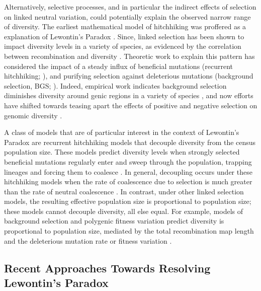 \documentclass[9pt,lineno]{elife}
\begin{document}
Alternatively, selective processes, and in particular the indirect effects of
selection on linked neutral variation, could potentially explain the observed
narrow range of diversity. The earliest mathematical model of hitchhiking was
proffered as a explanation of Lewontin's Paradox \citep{Maynard_Smith1974-zr}.
Since, linked selection has been shown to impact diversity levels in a variety
of species, as evidenced by the correlation between recombination and diversity
\citep{Aguade1989-jx,Begun1992-ey,Cutter2003-tl,Stephan1998-hh,Cai2009-by}.
Theoretic work to explain this pattern has considered the impact of a steady
influx of beneficial mutations (recurrent hitchhiking;
\cite{Stephan1992-jc,Stephan1995-ry}), and purifying selection against
deleterious mutations (background selection, BGS;
\cite{Charlesworth1993-gb,Nordborg1996-nq,Hudson1994-oh,Hudson1995-xc}).
Indeed, empirical work indicates background selection diminishes diversity
around genic regions in a variety of species
\citep{McVicker2009-ax,Hernandez2011-gs,Charlesworth1996-px}, and now efforts
have shifted towards teasing apart the effects of positive and negative
selection on genomic diversity \citep{Elyashiv2016-vt}.

A class of models that are of particular interest in the context of Lewontin's
Paradox are recurrent hitchhiking models that decouple diversity from the
census population size. These models predict diversity levels when strongly
selected beneficial mutations regularly enter and sweep through the population,
trapping lineages and forcing them to coalesce
\citep{Kaplan1989-sc,Gillespie2000-mh}. In general, decoupling occurs under
these hitchhiking models when the rate of coalescence due to selection is much
greater than the rate of neutral coalescence \citep[e.g.][equation
22]{Coop2012-cd}. In contrast, under other linked selection models, the
resulting effective population size is proportional to population size; these
models cannot decouple diversity, all else equal. For example, models of
background selection and polygenic fitness variation predict diversity is
proportional to population size, mediated by the total recombination map length
and the deleterious mutation rate or fitness variation
\citep{Charlesworth1993-gb,Nicolaisen2012-vs,Nordborg1996-nq,Robertson1961-ho,Santiago1995-hx,Santiago1998-bs}.

\subsection{Recent Approaches Towards Resolving Lewontin's Paradox}
\end{document}
